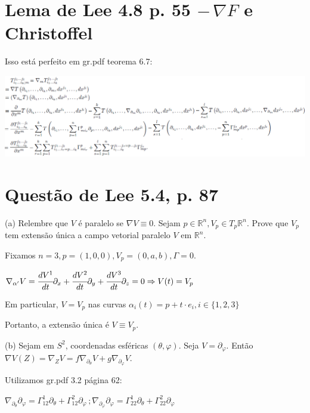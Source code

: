 \documentclass[10pt,a4paper]{article}
\begin{document}
	\section{Lema de Lee 4.8 p. 55 $-\, \nabla F$ e Christoffel}
		\begin{flushright}
		\end{flushright}

		Isso est\'a perfeito em gr.pdf teorema 6.7:

		\begin{center}
		\includegraphics[scale=.67]{deriv_total_christoffel}
		\end{center}

	\section{Quest\~ao de Lee 5.4, p. 87}
		\begin{flushright}
		\end{flushright}

		(a) Relembre que $V$ \'e paralelo se $\nabla V \equiv 0$. Sejam $p \in \mathbb{R}^n, V_p \in T_p \mathbb{R}^n$. Prove que $V_p$ tem extens\~ao \'unica a campo vetorial paralelo $V$ em $\mathbb{R}^n$.

		Fixamos $n = 3, p = (1,0,0), V_p = (0, a, b), \Gamma = 0$.

		$\nabla_{\alpha'} V = \cfrac{dV^1}{dt} \partial_x + \cfrac{dV^2}{dt} \partial_y + \cfrac{dV^3}{dt} \partial_z = 0 \Rightarrow V(t) = V_p$

		Em particular, $V = V_p$ nas curvas $\alpha_i(t) = p + t \cdot e_i, i \in \{ 1,2,3 \}$

		Portanto, a extens\~ao \'unica \'e $V \equiv V_p$.

		\vspace{3mm}

		(b) Sejam em $S^2$, coordenadas esf\'ericas $(\theta, \varphi)$. Seja $V = \partial_\varphi$. Ent\~ao $\nabla V(Z) = \nabla_Z V = f \nabla_{\partial_\theta}V + g\nabla_{\partial_\varphi}V$.

		Utilizamos gr.pdf 3.2 p\'agina 62:

		$\nabla_{\partial_\theta} \partial_\varphi = \Gamma_{12}^1 \partial_\theta + \Gamma_{12}^2 \partial_\varphi\,;\nabla_{\partial_\varphi} \partial_\varphi = \Gamma_{22}^1 \partial_\theta + \Gamma_{22}^2 \partial_\varphi$
\end{document}
